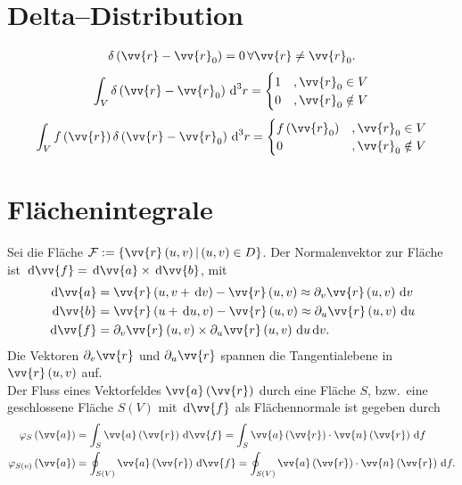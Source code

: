 \documentclass[a4paper,12pt]{article}
\newcommand{\td}{\,\text{d}}
\numberwithin{equation}{section}
\begin{document}
\newpage
\section{Delta--Distribution}
\begin{align} 
        \delta \left(\vv{r}-\vv{r}_0\right)=0\,\forall \vv{r}\neq \vv{r}_0
.\end{align} 
\begin{align} 
        \int_{V}^{}\delta \left(\vv{r}-\vv{r}_0\right)\td ^3r=\begin{cases}
                1&,\vv{r}_0 \in V\\
                0&,\vv{r}_0 \notin V
        \end{cases}
\end{align} 
\begin{align} 
        \int_{V}^{}f\left(\vv{r}\right)\delta \left(\vv{r}-\vv{r}_0\right)\td ^3r=\begin{cases}
                f\left(\vv{r}_0\right)&,\vv{r}_0 \in V\\
                0&,\vv{r}_0 \notin V
        \end{cases}
\end{align} 


\newpage
\section{Flächenintegrale}
Sei die Fläche $\mathcal{F}:=\left\{\vv{r}\left(u,v\right)|\left(u,v\right) \in D\right\}$. Der Normalenvektor zur Fläche ist $\td \vv{f}=\td \vv{a}\times \td \vv{b}$, mit
\begin{align} 
        \td \vv{a}&=\vv{r}\left(u,v+\td v\right)-\vv{r}\left(u,v\right)\approx \partial_v \vv{r}\left(u,v\right)\td v\\
        \td \vv{b}&=\vv{r}\left(u+\td u,v\right)-\vv{r}\left(u,v\right)\approx \partial_u \vv{r}\left(u,v\right)\td u\\
        \td \vv{f}&=\partial_v \vv{r}\left(u,v\right)\times \partial_u\vv{r}\left(u,v\right)\td u\td v
.\end{align} 
Die Vektoren $\partial_v \vv{r}$ und $\partial_u \vv{r}$ spannen die Tangentialebene in $\vv{r}\left(u,v\right)$ auf.\\\indent
Der Fluss eines Vektorfeldes $\vv{a}\left(\vv{r}\right)$ durch eine Fläche $S$, bzw.\ eine geschlossene Fläche $S\left(V\right)$ mit $\td \vv{f}$ als Flächennormale ist gegeben durch
\begin{align} 
        \varphi _S\left(\vv{a}\right)&=\int_{S}^{}\vv{a}\left(\vv{r}\right)\td \vv{f}=\int_{S}^{}\vv{a}\left(\vv{r}\right)\cdot \vv{n}\left(\vv{r}\right)\td f\\
        \varphi _{S\left(v\right)}\left(\vv{a}\right)&=\oint_{S\left(V\right)}^{}\vv{a}\left(\vv{r}\right)\td \vv{f}=\oint_{S\left(V\right)}^{}\vv{a}\left(\vv{r}\right)\cdot \vv{n}\left(\vv{r}\right)\td f
.\end{align} 
\end{document}
